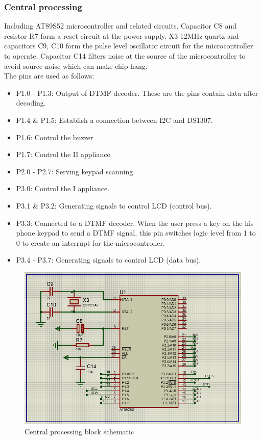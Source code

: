 \documentclass[a4paper]{article}
\begin{document}
\subsubsection{Central processing}
Including AT89S52 microcontroller and related circuits. Capacitor C8 and resistor R7 form a reset circuit at the power supply. X3 12MHz quartz and capacitors C9, C10 form the pulse level oscillator circuit for the microcontroller to operate. Capacitor C14 filters noise at the source of the microcontroller to avoid source noise which can make chip hang.\\
The pins are used as follows:
\begin{itemize}
    \item P1.0 - P1.3: Output of DTMF decoder. These are the pins contain data after decoding.
    \item P1.4 \& P1.5: Establish a connection between I2C and DS1307.
    \item P1.6: Control the buzzer
    \item P1.7: Control the II appliance.
    \item P2.0 - P2.7: Serving keypad scanning.
    \item P3.0: Control the I appliance.
    \item P3.1 \& P3.2: Generating signals to control LCD (control bus).
    \item P3.3: Connected to a DTMF decoder. When the user press a key on the his phone keypad to send a DTMF signal, this pin switches logic level from 1 to 0 to create an interrupt for the microcontroller.
    \item P3.4 - P3.7: Generating signals to control LCD (data bus).
\end{itemize}
\begin{figure}[h!]
\centering
\includegraphics[width=15cm]{images/CP.PNG}
\caption*{Central processing block schematic}
\end{figure}
\end{document}
